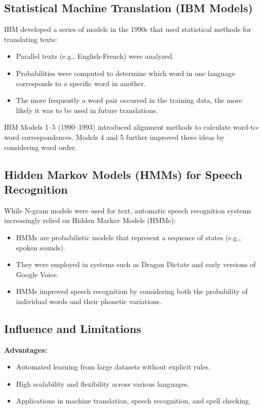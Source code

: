 \subsection{Statistical Machine Translation (IBM Models)}

IBM developed a series of models in the 1990s that used statistical methods for
translating texts:
\begin{itemize}
  \item Parallel texts (e.g., English-French) were analyzed.
  \item Probabilities were computed to determine which word in one language corresponds
        to a specific word in another.
  \item The more frequently a word pair occurred in the training data, the more likely it was
        to be used in future translations.
\end{itemize}
IBM Models 1--5 (1990–1993) introduced alignment methods to calculate word-to-word
correspondences. Models 4 and 5 further improved these ideas by considering word order.

\subsection{Hidden Markov Models (HMMs) for Speech Recognition}

While N-gram models were used for text, automatic speech recognition systems increasingly
relied on Hidden Markov Models (HMMs):
\begin{itemize}
  \item HMMs are probabilistic models that represent a sequence of states (e.g., spoken sounds).
  \item They were employed in systems such as Dragon Dictate and early versions of Google Voice.
  \item HMMs improved speech recognition by considering both the probability of individual
        words and their phonetic variations.
\end{itemize}

\subsection{Influence and Limitations}

\textbf{Advantages:}
\begin{itemize}
  \item Automated learning from large datasets without explicit rules.
  \item High scalability and flexibility across various languages.
  \item Applications in machine translation, speech recognition, and spell checking.
\end{itemize}

